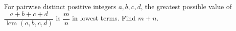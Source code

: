 For pairwise distinct positive integers $a,b,c,d$, the greatest possible value of $\dfrac{a+b+c+d}{\operatorname{lcm}(a,b,c,d)}$ is $\dfrac{m}{n}$ in lowest terms. Find $m+n$.
